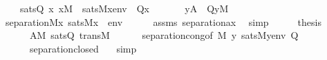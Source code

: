 \begin{isabellebody}
\ \ \ \ satsQ{\isacharcolon}{\kern0pt}\ {\isachardoublequoteopen}{\isasymAnd}x{\isachardot}{\kern0pt}\ x{\isasymin}M\ {\isasymLongrightarrow}\ sats{\isacharparenleft}{\kern0pt}M{\isacharcomma}{\kern0pt}{\isasymphi}{\isacharcomma}{\kern0pt}{\isacharbrackleft}{\kern0pt}x{\isacharbrackright}{\kern0pt}{\isacharat}{\kern0pt}env{\isacharparenright}{\kern0pt}\ {\isasymlongleftrightarrow}\ Q{\isacharparenleft}{\kern0pt}x{\isacharparenright}{\kern0pt}{\isachardoublequoteclose}\isanewline
\ \ \isanewline
\ \ \ \ {\isachardoublequoteopen}{\isacharbraceleft}{\kern0pt}y{\isasymin}A\ {\isachardot}{\kern0pt}\ Q{\isacharparenleft}{\kern0pt}y{\isacharparenright}{\kern0pt}{\isacharbraceright}{\kern0pt}{\isasymin}M{\isachardoublequoteclose}\isanewline
%
\isadelimproof
%
\endisadelimproof
%
\isatagproof
{}\isamarkupfalse%
\ {\isacharminus}{\kern0pt}\isanewline
\ \ \isamarkupfalse%
\ {\isachardoublequoteopen}separation{\isacharparenleft}{\kern0pt}{\isacharhash}{\kern0pt}{\isacharhash}{\kern0pt}M{\isacharcomma}{\kern0pt}{\isasymlambda}x{\isachardot}{\kern0pt}\ sats{\isacharparenleft}{\kern0pt}M{\isacharcomma}{\kern0pt}{\isasymphi}{\isacharcomma}{\kern0pt}{\isacharbrackleft}{\kern0pt}x{\isacharbrackright}{\kern0pt}\ {\isacharat}{\kern0pt}\ env{\isacharparenright}{\kern0pt}{\isacharparenright}{\kern0pt}{\isachardoublequoteclose}\isanewline
\ \ \ \ \isamarkupfalse%
\ assms\ separation{\isacharunderscore}{\kern0pt}ax\ \isamarkupfalse%
\ simp\isanewline
\ \ \isamarkupfalse%
\ \isamarkupfalse%
\ {\isacharquery}{\kern0pt}thesis\ \isamarkupfalse%
\isanewline
\ \ \ \ \ \ {\isacartoucheopen}A{\isasymin}M{\isacartoucheclose}\ satsQ\ trans{\isacharunderscore}{\kern0pt}M\isanewline
\ \ \ \ \ \ separation{\isacharunderscore}{\kern0pt}cong{\isacharbrackleft}{\kern0pt}of\ {\isachardoublequoteopen}{\isacharhash}{\kern0pt}{\isacharhash}{\kern0pt}M{\isachardoublequoteclose}\ {\isachardoublequoteopen}{\isasymlambda}y{\isachardot}{\kern0pt}\ sats{\isacharparenleft}{\kern0pt}M{\isacharcomma}{\kern0pt}{\isasymphi}{\isacharcomma}{\kern0pt}{\isacharbrackleft}{\kern0pt}y{\isacharbrackright}{\kern0pt}{\isacharat}{\kern0pt}env{\isacharparenright}{\kern0pt}{\isachardoublequoteclose}\ {\isachardoublequoteopen}Q{\isachardoublequoteclose}{\isacharbrackright}{\kern0pt}\isanewline
\ \ \ \ \ \ separation{\isacharunderscore}{\kern0pt}closed\ \ \isamarkupfalse%
\ simp\isanewline
{}\isamarkupfalse%
%
\endisatagproof
{\isafoldproof}%
%
\isadelimproof
\isanewline
%
\endisadelimproof
%
\isadelimtheory
\isanewline
%
\endisadelimtheory
%
\isatagtheory
{}\isamarkupfalse%
%
\endisatagtheory
{\isafoldtheory}%
%
\isadelimtheory
%
\endisadelimtheory
%
\end{isabellebody}%
